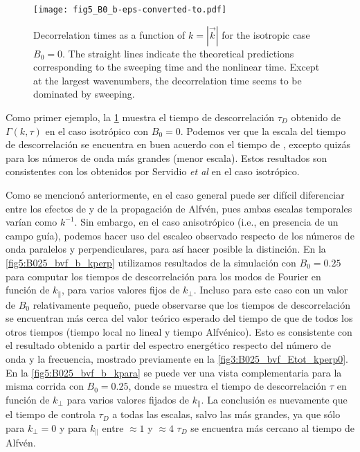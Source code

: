 \begin{figure}
  \texttt{[image: fig5\_B0\_b-eps-converted-to.pdf]}
  \caption{Decorrelation times as a function of $k=|\vec{k}|$ for the
    isotropic case $B_0=0$. The straight lines indicate the
    theoretical predictions corresponding to the sweeping time and the
    nonlinear time. Except at the largest wavenumbers, the
    decorrelation time seems to be dominated by sweeping.}
  \label{fig5:B0_bvf_b_kpara_0}
\end{figure}

Como primer ejemplo, la \cref{fig5:B0_bvf_b_kpara_0} muestra el tiempo
de descorrelación $\tau_D$ obtenido de $\Gamma(k,\tau)$ en el caso
isotrópico con $B_0=0$.  Podemos ver que la escala del tiempo de
descorrelación se encuentra en buen acuerdo con el tiempo de
\sweeping, excepto quizás para los números de onda más grandes (menor
escala).  Estos resultados son consistentes con los obtenidos por
Servidio {\it et al} \cite{servidio_time_2011} en el caso isotrópico.

Como se mencionó anteriormente, en el caso general puede ser difícil
diferenciar entre los efectos de \sweeping y de la propagación de
Alfvén, pues ambas escalas temporales varían como $k^{-1}$. Sin
embargo, en el caso anisotrópico (i.e., en presencia de un campo
guía), podemos hacer uso del escaleo observado respecto de los números
de onda paralelos y perpendiculares, para así hacer posible la
distinción.  En la \cref{fig5:B025_bvf_b_kperp} utilizamos resultados
de la simulación con $B_0=0.25$ para computar los tiempos de
descorrelación para los modos de Fourier en función de $k_\parallel$,
para varios valores fijos de $k_\perp$. Incluso para este caso con un
valor de $B_0$ relativamente pequeño, puede observarse que los tiempos
de descorrelación se encuentran más cerca del valor teórico esperado
del tiempo de \sweeping que de todos los otros tiempos (tiempo local
no lineal y tiempo Alfvénico). Esto es consistente con el resultado
obtenido a partir del espectro energético respecto del número de onda
y la frecuencia, mostrado previamente en la
\cref{fig3:B025_bvf_Etot_kperp0}. En la \cref{fig5:B025_bvf_b_kpara}
se puede ver una vista complementaria para la misma corrida con
$B_0=0.25$, donde se muestra el tiempo de descorrelación $\tau$ en
función de $k_\perp$ para varios valores fijados de $k_\parallel$. La
conclusión es nuevamente que el tiempo de \sweeping controla $\tau_D$
a todas las escalas, salvo las más grandes, ya que sólo para
$k_\perp=0$ y para $k_\parallel$ entre $\approx 1$ y $\approx 4$
$\tau_D$ se encuentra más cercano al tiempo de Alfvén.

